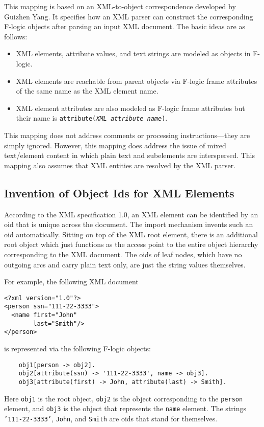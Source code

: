 This mapping is based on an XML-to-\FLORA object correspondence developed
by Guizhen Yang.
It specifies how an XML parser can construct the
corresponding F-logic objects after parsing an input XML document.
The basic ideas are as follows:
\begin{itemize}
\item XML elements, attribute values,
  and text strings are modeled as objects in F-logic.

\item XML elements are reachable from parent objects
  via F-logic frame attributes of the same
  name as the XML element name.

\item XML element attributes are also modeled as F-logic  frame attributes
    but their name is
    \texttt{attribute(\textnormal{\emph{XML attribute name}})}.
\end{itemize}

This mapping does not address 
comments or processing instructions---they are simply ignored.
However, this mapping does address the issue of mixed
text/element content in which plain text and subelements are interspersed.
This mapping also assumes that XML entities are
resolved by the XML parser.



\subsection{Invention of Object Ids for XML Elements}

According to the XML specification 1.0, an XML element can be identified
by an oid that is unique across the document. The import mechanism invents
such an oid automatically.
Sitting on top of the XML root element, there is an additional root
object which just functions as the access point to the entire object
hierarchy corresponding to the XML document.
The oids of leaf nodes, which have no outgoing arcs and carry
plain text only, are just the string values themselves.

For example, the following XML document

\begin{verbatim}
<?xml version="1.0"?>
<person ssn="111-22-3333">
  <name first="John" 
        last="Smith"/>
</person>
\end{verbatim}
is represented via the following F-logic objects:
\begin{verbatim}
    obj1[person -> obj2].
    obj2[attribute(ssn) -> '111-22-3333', name -> obj3].
    obj3[attribute(first) -> John, attribute(last) -> Smith].
\end{verbatim}
Here \texttt{obj1}  is the root object, \texttt{obj2} is the object
corresponding to the \texttt{person} element, and \texttt{obj3} is the
object that represents the \texttt{name} element. The strings
\texttt{'111-22-3333'}, \texttt{John}, and \texttt{Smith} are oids that
stand for themselves.       


